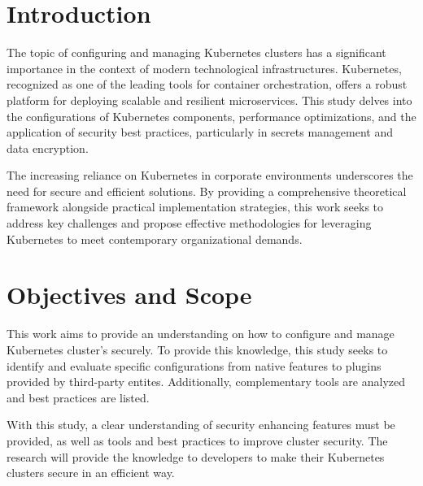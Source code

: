 \documentclass[a4paper,11pt,openright,BCOR=15mm]{scrbook}
\begin{document}
	\cleardoublepage
	

	
	
	
	\tableofcontents
	\listoffigures
	
	
	
	
	\mainmatter 
	
	

	\chapter{Introduction}

The topic of configuring and managing Kubernetes clusters has a significant importance in the context of modern technological infrastructures. Kubernetes, recognized as one of the leading tools for container orchestration, offers a robust platform for deploying scalable and resilient microservices. This study delves into the configurations of Kubernetes components, performance optimizations, and the application of security best practices, particularly in secrets management and data encryption.

The increasing reliance on Kubernetes in corporate environments underscores the need for secure and efficient solutions. By providing a comprehensive theoretical framework alongside practical implementation strategies, this work seeks to address key challenges and propose effective methodologies for leveraging Kubernetes to meet contemporary organizational demands.

	
	\chapter{Objectives and Scope}

This work aims to provide an understanding on how to configure and manage Kubernetes cluster's securely. To provide this knowledge, this study seeks to identify and evaluate specific configurations from native features to plugins provided by third-party entites. Additionally, complementary tools are analyzed and best practices are listed.

With this study, a clear understanding of security enhancing features must be provided, as well as tools and best practices to improve cluster security. The research will provide the knowledge to developers to make their Kubernetes clusters secure in an efficient way.
\end{document}
